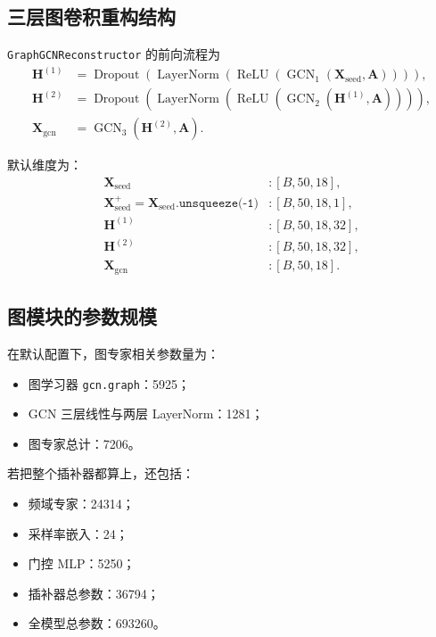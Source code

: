 \documentclass[UTF8]{ctexart}
\begin{document}
\subsection{三层图卷积重构结构}

\verb|GraphGCNReconstructor| 的前向流程为
\begin{align}
    \bm{H}^{(1)} &= \operatorname{Dropout}\!\left(
        \operatorname{LayerNorm}\!\left(
            \operatorname{ReLU}\!\left(
                \operatorname{GCN}_1(\bm{X}_{\text{seed}}, \bm{A})
            \right)
        \right)
    \right), \\
    \bm{H}^{(2)} &= \operatorname{Dropout}\!\left(
        \operatorname{LayerNorm}\!\left(
            \operatorname{ReLU}\!\left(
                \operatorname{GCN}_2(\bm{H}^{(1)}, \bm{A})
            \right)
        \right)
    \right), \\
    \bm{X}_{\text{gcn}} &= \operatorname{GCN}_3(\bm{H}^{(2)}, \bm{A}).
\end{align}

默认维度为：
\begin{align}
    \bm{X}_{\text{seed}} &: [B,50,18], \\
    \bm{X}_{\text{seed}}^{+} = \bm{X}_{\text{seed}}.\texttt{unsqueeze(-1)} &: [B,50,18,1], \\
    \bm{H}^{(1)} &: [B,50,18,32], \\
    \bm{H}^{(2)} &: [B,50,18,32], \\
    \bm{X}_{\text{gcn}} &: [B,50,18].
\end{align}

\subsection{图模块的参数规模}

在默认配置下，图专家相关参数量为：
\begin{itemize}
    \item 图学习器 \verb|gcn.graph|：5925；
    \item GCN 三层线性与两层 LayerNorm：1281；
    \item 图专家总计：7206。
\end{itemize}

若把整个插补器都算上，还包括：
\begin{itemize}
    \item 频域专家：24314；
    \item 采样率嵌入：24；
    \item 门控 MLP：5250；
    \item 插补器总参数：36794；
    \item 全模型总参数：693260。
\end{itemize}
\end{document}
